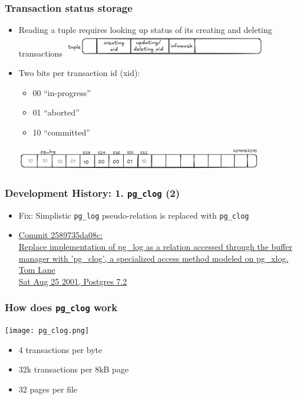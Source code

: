 \begin{frame}
  \frametitle{Transaction status storage}
  \begin{itemize}
    \item Reading a tuple requires looking up status of its creating
	    and deleting transactions
  \includegraphics[width=0.7\textwidth]{tuple0.png}

\item Two bits per transaction id (xid):
  \begin{itemize}
    \item 00 \textrightarrow{} ``in-progress''
    \item 01 \textrightarrow{} ``aborted''
    \item 10 \textrightarrow{} ``committed''
  \end{itemize}
  \includegraphics[width=0.85\textwidth]{pg_log.png}
  \end{itemize}

\end{frame}

\begin{frame}
  \frametitle{Development History: 1. \texttt{pg\_clog} (2)}

  \begin{itemize}
    \item Fix: Simplistic \texttt{pg\_log} pseudo-relation is replaced with \texttt{pg\_clog}
    \item {\linksize \href{https://git.postgresql.org/cgit/postgresql.git/commit/?id=2589735da08c4e597accb6eab5ae65b6339ee630}
      {Commit 2589735da08c: \faExternalLink \\
      Replace implementation of pg\_log as a relation accessed through the buffer manager with 'pg\_clog', a specialized access method modeled on pg\_xlog. \\
      Tom Lane \\
      Sat Aug 25 2001, Postgres 7.2}}
  \end{itemize}
\end{frame}

\begin{frame}
  \frametitle{How does \texttt{pg\_clog} work}
  \texttt{[image: pg\_clog.png]}
  \begin{itemize}
    \item 4 transactions per byte
    \item 32k transactions per 8kB page
    \item 32 pages per file
  \end{itemize}
\end{frame}

